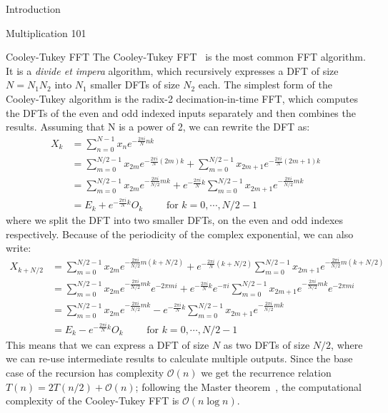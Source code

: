 \documentclass[a4paper,10pt]{article}
\begin{document}
\begin{section}{Introduction}
\begin{subsection}{Multiplication 101}
    \begin{subsubsection}{Cooley-Tukey FFT}
        The Cooley-Tukey FFT~\cite{cooley1965algorithm} is the most common FFT algorithm. It is a \textit{divide et impera} algorithm, which recursively expresses a DFT of
        size $N = N_1 N_2$ into $N_1$ smaller DFTs of size $N_2$ each. The simplest form of the Cooley-Tukey algorithm is the radix-2 decimation-in-time FFT, which computes the DFTs of
        the even and odd indexed inputs separately and then combines the results. Assuming that N is a power of 2, we can rewrite the DFT as:
        \begin{align*}
            X_k & = \sum_{n=0}^{N-1} x_n e^{-\frac{2\pi i}{N}nk} \\
                & = \sum_{m=0}^{N/2-1}x_{2m}e^{-\frac{2\pi i}{N}(2m)k} + \sum_{m=0}^{N/2-1}x_{2m+1}e^{-\frac{2\pi i}{N}(2m+1)k} \\
                & = \sum_{m=0}^{N/2-1}x_{2m}e^{-\frac{2\pi i}{N/2}mk} + e^{-\frac{2\pi i}{N}k}\sum_{m=0}^{N/2-1}x_{2m+1}e^{-\frac{2\pi i}{N/2}mk} \\
                & = E_k + e^{-\frac{2\pi i}{N}k}O_k \qquad \text{ for } k = 0, \cdots, N/2-1
        \end{align*}
        where we split the DFT into two smaller DFTs, on the even and odd indexes respectively. Because of the periodicity of the complex exponential, we can also write:
        \begin{align*}
            X_{k+N/2} & = \sum_{m=0}^{N/2-1}x_{2m}e^{-\frac{2\pi i}{N/2}m(k+N/2)} + e^{-\frac{2\pi i}{N}(k+N/2)}\sum_{m=0}^{N/2-1}x_{2m+1}e^{-\frac{2\pi i}{N/2}m(k+N/2)} \\
                & = \sum_{m=0}^{N/2-1}x_{2m}e^{-\frac{2\pi i}{N/2}mk}e^{-2\pi mi} + e^{-\frac{2\pi i}{N}k}e^{-\pi i}\sum_{m=0}^{N/2-1}x_{2m+1}e^{-\frac{2\pi i}{N/2}mk}e^{-2\pi mi} \\
                & = \sum_{m=0}^{N/2-1}x_{2m}e^{-\frac{2\pi i}{N/2}mk} - e^{-\frac{2\pi i}{N}k}\sum_{m=0}^{N/2-1}x_{2m+1}e^{-\frac{2\pi i}{N/2}mk} \\
                & = E_k - e^{-\frac{2\pi i}{N}k}O_k \qquad \text{ for } k = 0, \cdots, N/2-1
        \end{align*}
        This means that we can express a DFT of size $N$ as two DFTs of size $N/2$, where we can re-use intermediate results to calculate multiple outputs. 
        Since the base case of the recursion has complexity $\mathcal{O}(n)$ we get the recurrence relation $T(n) = 2T(n/2) + \mathcal{O}(n)$;
        following the Master theorem~\cite{bentley1980general}, the computational complexity of the Cooley-Tukey FFT is $\mathcal{O}(n\log n)$.
    \end{subsubsection}


\end{subsection}
\end{section}
\end{document}
